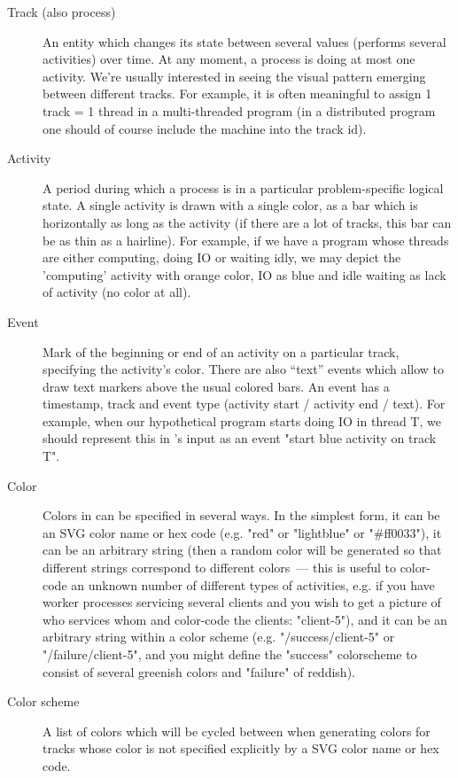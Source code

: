 \documentclass{article}
\begin{document}
\begin{description}
\item[Track (also process)] An entity which changes its state between several values (performs several activities) over time. At any moment, a process is doing at most one activity. We're usually interested in seeing the visual pattern emerging between different tracks. For example, it is often meaningful to assign 1 track = 1 thread in a multi-threaded program (in a distributed program one should of course include the machine into the track id).
\item[Activity] A period during which a process is in a particular problem-specific logical state. A single activity is drawn with a single color, as a bar which is horizontally as long as the activity (if there are a lot of tracks, this bar can be as thin as a hairline). For example, if we have a program whose threads are either computing, doing IO or waiting idly, we may depict the 'computing' activity with orange color, IO as blue and idle waiting as lack of activity (no color at all).
\item[Event] Mark of the beginning or end of an activity on a particular track, specifying the activity's color. There are also ``text'' events which allow to draw text markers above the usual colored bars. An event has a timestamp, track and event type (activity start / activity end / text). For example, when our hypothetical program starts doing IO in thread T, we should represent this in \splot{}'s input as an event "start blue activity on track T".
\item[Color] Colors in \splot{} can be specified in several ways. In the simplest form, it can be an SVG color name or hex code (e.g. "red" or "lightblue" or "\#ff0033"), it can be an arbitrary string (then a random color will be generated so that different strings correspond to different colors~--- this is useful to color-code an unknown number of different types of activities, e.g. if you have worker processes servicing several clients and you wish to get a picture of who services whom and color-code the clients: "client-5"), and it can be an arbitrary string within a color scheme (e.g. "/success/client-5" or "/failure/client-5", and you might define the "success" colorscheme to consist of several greenish colors and "failure" of reddish).
\item[Color scheme] A list of colors which will be cycled between when generating colors for tracks whose color is not specified explicitly by a SVG color name or hex code.
\end{description}
\end{document}
